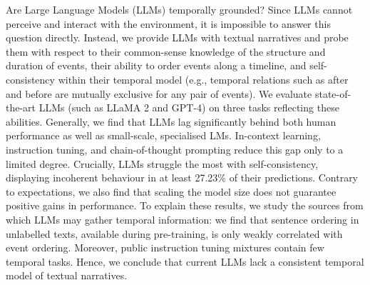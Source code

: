 Are Large Language Models (LLMs) temporally grounded? Since LLMs cannot perceive and interact with the environment, it is impossible to answer this question directly. Instead, we provide LLMs with textual narratives and probe them with respect to their common-sense knowledge of the structure and duration of events, their ability to order events along a timeline, and self-consistency within their temporal model (e.g., temporal relations such as after and before are mutually exclusive for any pair of events).  We evaluate state-of-the-art LLMs (such as LLaMA 2 and GPT-4) on three tasks reflecting these abilities. Generally, we find that LLMs lag significantly behind both human performance as well as small-scale, specialised LMs. In-context learning, instruction tuning, and chain-of-thought prompting reduce this gap only to a limited degree. Crucially, LLMs struggle the most with self-consistency, displaying incoherent behaviour in at least 27.23\% of their predictions. Contrary to expectations, we also find that scaling the model size does not guarantee positive gains in performance. To explain these results, we study the sources from which LLMs may gather temporal information: we find that sentence ordering in unlabelled texts, available during pre-training, is only weakly correlated with event ordering. Moreover, public instruction tuning mixtures contain few temporal tasks. Hence, we conclude that current LLMs lack a consistent temporal model of textual narratives.
